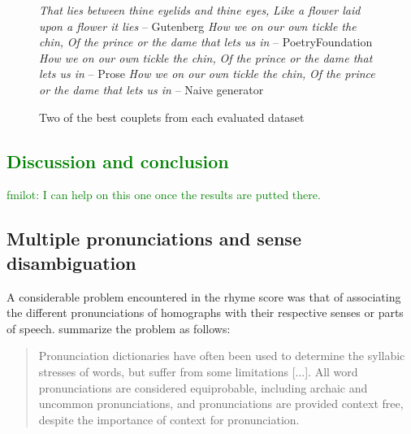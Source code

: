 \documentclass[11pt,a4paper]{article}
\begin{document}
\begin{figure}
	\textit{That lies between thine eyelids and thine eyes,} \newline
	\textit{Like a flower laid upon a flower it lies} \newline
	-- Gutenberg
	\vspace{0.5em}
	\newline
	\textit{How we on our own tickle the chin,} \newline
	\textit{Of the prince or the dame that lets us in} \newline
	-- PoetryFoundation
	\vspace{0.5em}
	\newline
	\textit{How we on our own tickle the chin,} \newline
	\textit{Of the prince or the dame that lets us in} \newline
	-- Prose
	\vspace{0.5em}
	\newline
	\textit{How we on our own tickle the chin,} \newline
	\textit{Of the prince or the dame that lets us in} \newline
	-- Naive generator
\caption{Two of the best couplets from each evaluated dataset}
\label{fig:bestcouplets}
\end{figure}

\textcolor{green}{
\section{Discussion and conclusion}
\label{sec:discconc}
fmilot: I can help on this one once the results are putted there.
}

\subsection{Multiple pronunciations and sense disambiguation}
\label{sec:synset}

A considerable problem encountered in the rhyme score was that of associating the different pronunciations of homographs with their respective senses or parts of speech. \citet{hopkins-kiela-2017} summarize the problem as follows:

\begin{quote}
Pronunciation dictionaries have often been used to determine the syllabic stresses of words, but suffer from some limitations [...]. All word pronunciations are considered equiprobable, including archaic and uncommon pronunciations, and pronunciations are provided context free, despite the importance of context for pronunciation.
\end{quote}
\end{document}
